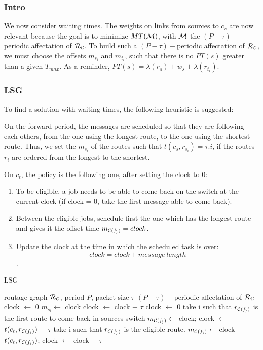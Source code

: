 \documentclass[a4paper,10pt]{article}
\begin{document}
     \subsubsection{Intro}
	  We now consider waiting times. The weights on links from sources to $c_s$ are now relevant because the goal is to minimize $MT({\cal M})$, with ${\cal M}$ the $(P-\tau)-$periodic affectation of ${\cal R_{\cal C}}$.
	  To build such a $(P-\tau)-$periodic affectation of ${\cal R_{\cal C}}$, we must choose the offsets $m_{s_i}$ and $m_{t_i}$, such that there is no $PT(s)$ greater than a given $T_{max}$.
	  As a reminder, $ PT(s)=\lambda(r_s)+ w_s+\lambda(r_{t_i})$.
     \subsubsection{LSG}
     

To find a solution with waiting times, the following heuristic is suggested:

On the forward period, the messages are scheduled so that they are following each others, from the one using the longest route, to the one using the shortest route. Thus, we set the $m_{s_i}$ of the routes such that  $t(c_s,r_{s_i}) = \tau.i$, if the routes $r_i$ are ordered from the longest to the shortest.

On $c_t$, the policy is the following one, after setting the clock to 0:
\begin{enumerate}
 \item To be eligible, a job needs to be able to come back on the switch at the current clock (if clock = 0, take the first message able to come back).
 \item Between the eligible jobs, schedule first the one which has the longest route and gives it the offset time $m_{\cal C(s_i)} = clock$.
 \item Update the clock at the time in which the scheduled task is over: $$clock = clock + message\ length$$.
\end{enumerate}

\begin{algorithm}[H]
\caption{LSG}
\begin{algorithmic}
\REQUIRE routage graph ${\cal R_{\cal C}}$, period $P$, packet size $\tau$
\ENSURE $(P-\tau)-$periodic affectation of ${\cal R_{\cal C}}$
\STATE clock $\leftarrow$ 0
\STATE  $m_{s_i} \leftarrow$ clock
\STATE clock $\leftarrow$ clock + $\tau$
\ENDFOR
\STATE clock $\leftarrow$ 0
\STATE take i such that $r_{\cal C(s_i)}$ is the first route to come back in sources switch
\STATE $m_{\cal C(s_i)} \leftarrow $ clock;
\STATE clock $\leftarrow$ $t(c_t,r_{\cal C(s_i)})$ + $\tau$
\STATE take i such that $r_{\cal C(s_i)}$ is the eligible route.
\STATE $m_{\cal C(s_i)} \leftarrow $ clock - $t(c_t,r_{\cal C(s_i)})$;
\STATE clock $\leftarrow$ clock + $\tau$

\ENDWHILE

\end{algorithmic}
\end{algorithm}
\end{document}
